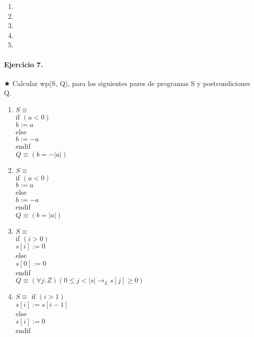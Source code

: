 \documentclass{article}
\begin{document}
\begin{enumerate}[label=\alph*)]
	\item
	\item
	\item
	\item
	\item
\end{enumerate}
                                                            
\paragraph{Ejercicio 7.} $\bigstar$ Calcular wp(S, Q), para los siguientes pares de programas S y postcondiciones Q.

\begin{enumerate}[label=\alph*)]
\item $S \equiv$\\
   if $( a < 0 )$\\
      $b := a$\\
   else\\
      $b := -a$\\
   endif\\

   $Q \equiv (b = -|a|)$\\
\item $S \equiv$\\
   if $( a < 0 )$\\
     $ b := a$\\
   else\\
     $ b := -a$\\
   endif\\

   $Q \equiv (b = |a|)$\\

\item $S \equiv$\\
   if $( i > 0 )$\\
     $ s [ i ] := 0$\\
   else\\
     $ s [ 0 ] := 0$\\
   endif\\

   $Q \equiv (\forall j :Z)(0 \leq j < |s| \rightarrow_L s[j] \geq 0)$\\
\item $S \equiv$
   if $( i > 1 )$\\
      $s [ i ] := s [ i -1]$\\
   else\\
     $ s [ i ] := 0$\\
   endif\\


\end{enumerate}
\end{document}
